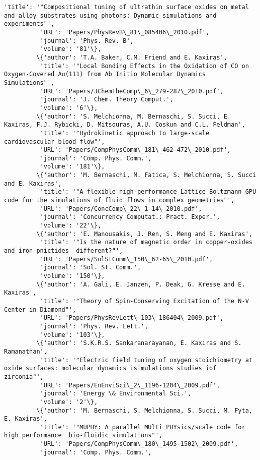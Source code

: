 \documentclass[11pt]{article}
\begin{document}
\begin{Verbatim}[commandchars=\\\{\}]
          'title': '"Compositional tuning of ultrathin surface oxides on metal and alloy substrates using photons: Dynamic simulations and experiments"',
          'URL': 'Papers/PhysRevB\_81\_085406\_2010.pdf',
          'journal': 'Phys. Rev. B',
          'volume': '81'\},
         \{'author': 'T.A. Baker, C.M. Friend and E. Kaxiras',
          'title': '"Local Bonding Effects in the Oxidation of CO on Oxygen-Covered Au(111) from Ab Initio Molecular Dynamics Simulations"',
          'URL': 'Papers/JChemTheComp\_6\_279-287\_2010.pdf',
          'journal': 'J. Chem. Theory Comput.',
          'volume': '6'\},
         \{'author': 'S. Melchionna, M. Bernaschi, S. Succi, E. Kaxiras, F.J. Rybicki, D. Mitsouras, A.U. Coskun and C.L. Feldman',
          'title': '"Hydrokinetic approach to large-scale cardiovascular blood flow"',
          'URL': 'Papers/CompPhysComm\_181\_462-472\_2010.pdf',
          'journal': 'Comp. Phys. Comm.',
          'volume': '181'\},
         \{'author': 'M. Bernaschi, M. Fatica, S. Melchionna, S. Succi and E. Kaxiras',
          'title': '"A flexible high-performance Lattice Boltzmann GPU code for the simulations of fluid flows in complex geometries"',
          'URL': 'Papers/ConcComp\_22\_1-14\_2010.pdf',
          'journal': 'Concurrency Computat.: Pract. Exper.',
          'volume': '22'\},
         \{'author': 'E. Manousakis, J. Ren, S. Meng and E. Kaxiras',
          'title': '"Is the nature of magnetic order in copper-oxides and iron-pnictides  different?"',
          'URL': 'Papers/SolStComm\_150\_62-65\_2010.pdf',
          'journal': 'Sol. St. Comm.',
          'volume': '150'\},
         \{'author': 'A. Gali, E. Janzen, P. Deak, G. Kresse and E. Kaxiras',
          'title': '"Theory of Spin-Conserving Excitation of the N-V Center in Diamond"',
          'URL': 'Papers/PhysRevLett\_103\_186404\_2009.pdf',
          'journal': 'Phys. Rev. Lett.',
          'volume': '103'\},
         \{'author': 'S.K.R.S. Sankaranarayanan, E. Kaxiras and S. Ramanathan',
          'title': '"Electric field tuning of oxygen stoichiometry at oxide surfaces: molecular dynamics isimulations studies iof zirconia"',
          'URL': 'Papers/EnEnviSci\_2\_1196-1204\_2009.pdf',
          'journal': 'Energy \& Environmental Sci.',
          'volume': '2'\},
         \{'author': 'M. Bernaschi, S. Melchionna, S. Succi, M. Fyta, E. Kaxiras',
          'title': '"MUPHY: A parallel MUlti PHYsics/scale code for high performance  bio-fluidic simulations"',
          'URL': 'Papers/CompPhysComm\_180\_1495-1502\_2009.pdf',
          'journal': 'Comp. Phys. Comm.',

\end{Verbatim}
\end{document}

